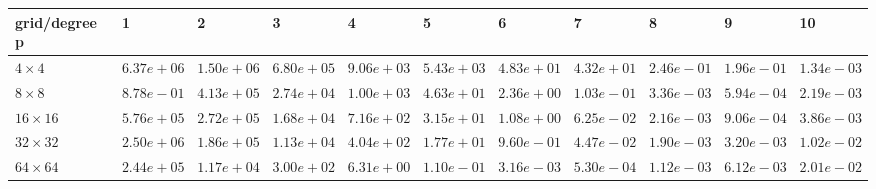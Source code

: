 \begin{tabular}{lllllllllll}
\hline
 grid/degree p   & 1          & 2          & 3          & 4          & 5          & 6          & 7          & 8          & 9          & 10         \\
\hline
 $4 \times 4$    & $6.37e+06$ & $1.50e+06$ & $6.80e+05$ & $9.06e+03$ & $5.43e+03$ & $4.83e+01$ & $4.32e+01$ & $2.46e-01$ & $1.96e-01$ & $1.34e-03$ \\
 $8 \times 8$    & $8.78e-01$ & $4.13e+05$ & $2.74e+04$ & $1.00e+03$ & $4.63e+01$ & $2.36e+00$ & $1.03e-01$ & $3.36e-03$ & $5.94e-04$ & $2.19e-03$ \\
 $16 \times 16$  & $5.76e+05$ & $2.72e+05$ & $1.68e+04$ & $7.16e+02$ & $3.15e+01$ & $1.08e+00$ & $6.25e-02$ & $2.16e-03$ & $9.06e-04$ & $3.86e-03$ \\
 $32 \times 32$  & $2.50e+06$ & $1.86e+05$ & $1.13e+04$ & $4.04e+02$ & $1.77e+01$ & $9.60e-01$ & $4.47e-02$ & $1.90e-03$ & $3.20e-03$ & $1.02e-02$ \\
 $64 \times 64$  & $2.44e+05$ & $1.17e+04$ & $3.00e+02$ & $6.31e+00$ & $1.10e-01$ & $3.16e-03$ & $5.30e-04$ & $1.12e-03$ & $6.12e-03$ & $2.01e-02$ \\
\hline
\end{tabular}